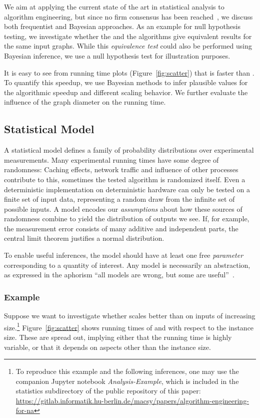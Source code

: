 \documentclass[algorithms,article,submit,moreauthors,pdftex]{Definitions/mdpi}
\newcommand{\changed}[1]{#1}
\begin{document}
We aim at applying the current state of the art in statistical analysis to algorithm engineering, but since no firm consensus has been reached~\cite{wasserstein2016asa}, we discuss both frequentist and Bayesian approaches.
%
As an example for null hypothesis testing, we investigate whether the \kad and the \rk algorithms give equivalent results for the same input graphs.
While this \emph{equivalence test} could also be performed using Bayesian inference, we use a null hypothesis test for illustration purposes.

It is easy to see from running time plots (\eg Figure~\ref{fig:scatter}) that \kad is faster than \rk.
To quantify this speedup, we use Bayesian methods to infer plausible values for the algorithmic speedup and different scaling behavior.
We further evaluate the influence of the graph diameter on the running time.

\subsection{Statistical Model}
\label{sec:stats:model}
A statistical model defines a family of probability distribution\changed{s} over experimental measurements.
Many experimental running times have some degree of randomness:
Caching effects, network traffic and influence of other processes contribute to this, sometimes the tested algorithm is randomized itself.
Even a deterministic implementation on deterministic hardware can only be tested on a finite set of input data, representing a random draw from the infinite set of possible inputs.
A model encodes our \emph{assumptions} about how these sources of randomness combine to yield the distribution of outputs we see.
If, for example, the measurement error consists of many additive and independent parts, the central limit theorem justifies a normal distribution.

To enable useful inferences, the model should have at least one free \emph{parameter} corresponding to a quantity of interest.
Any model is necessarily an abstraction, as expressed in the aphorism ``all models are wrong, but some are useful''~\cite{Box1976models}.

\subsubsection{Example}
Suppose we want to investigate whether \kad scales better than \rk on inputs of increasing size.\footnote{\changed{To reproduce this example and the following inferences,
  one may use the companion Jupyter notebook {\it Analysis-Example}, which is included in the statistics subdirectory of the public repository of this paper:
\url{https://gitlab.informatik.hu-berlin.de/macsy/papers/algorithm-engineering-for-na}}}
Figure~\ref{fig:scatter} shows running times of \kad and \rk with respect to the instance size.
These are spread out, implying either that the running time is highly variable, or that it depends on aspects other than the instance size.
\end{document}
